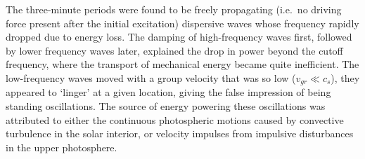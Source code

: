 \documentclass[12pt]{article}
\begin{document}
The three-minute periods were found to be freely propagating
(i.e.\ no driving force present after the initial excitation)
dispersive waves whose frequency rapidly dropped due to energy loss.
The damping of high-frequency waves first, followed by
lower frequency waves later,
explained the drop in power beyond the cutoff frequency,
where the transport of mechanical energy became quite inefficient.
The low-frequency waves moved with a group velocity that was so low
($v_{gr} \ll c_{s}$), they appeared to `linger' at a given location,
giving the false impression of being standing oscillations.
The source of energy powering these
oscillations was attributed to either the continuous
photospheric motions caused by convective turbulence
in the solar interior, or velocity impulses from impulsive disturbances
in the upper photosphere.

%
\end{document}
